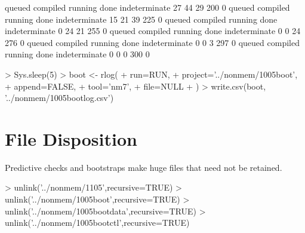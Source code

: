 \begin{Schunk}
\begin{Soutput}
       queued      compiled       running          done indeterminate 
           27            44            29           200             0 
       queued      compiled       running          done indeterminate 
           15            21            39           225             0 
       queued      compiled       running          done indeterminate 
            0            24            21           255             0 
       queued      compiled       running          done indeterminate 
            0             0            24           276             0 
       queued      compiled       running          done indeterminate 
            0             0             3           297             0 
       queued      compiled       running          done indeterminate 
            0             0             0           300             0 
\end{Soutput}
\begin{Sinput}
> Sys.sleep(5)
> boot <- rlog(
+ 	run=RUN,
+ 	project='../nonmem/1005boot',
+ 	append=FALSE,
+ 	tool='nm7',
+   file=NULL
+ )
> write.csv(boot, '../nonmem/1005bootlog.csv')
\end{Sinput}
\end{Schunk}
\section{File Disposition}
Predictive checks and bootstraps make huge files that need not be retained.
\begin{Schunk}
\begin{Sinput}
> unlink('../nonmem/1105',recursive=TRUE)
> unlink('../nonmem/1005boot',recursive=TRUE)
> unlink('../nonmem/1005bootdata',recursive=TRUE)
> unlink('../nonmem/1005bootctl',recursive=TRUE)
\end{Sinput}
\end{Schunk}

